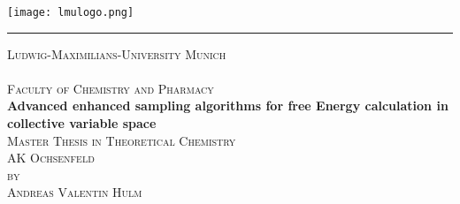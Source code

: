 
\begin{titlepage}

\begin{center}
{

\vspace*{-1.5cm}
\hfill \texttt{[image: lmulogo.png]}

\hrule                                 %

\textsc{\LARGE Ludwig-Maximilians-University Munich}\\[2cm]

\textsc{\Large }\\[0.5cm]

\textsc{\Large Faculty of Chemistry and Pharmacy}\\[2.5cm]

\textbf{\LARGE Advanced enhanced sampling algorithms for free Energy calculation in collective variable space} \\[0.5cm]

\textsc{\Large Master Thesis in Theoretical Chemistry}\\[2.0cm]

\textsc{AK Ochsenfeld}\\[2.0cm]

\textsc{by}\\
\textsc{Andreas Valentin Hulm} \\[1,5cm]


\vspace{3.5cm}


}
\end{center}

\end{titlepage}


